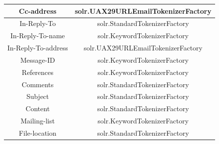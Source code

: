 \documentclass[a4paper,english]{report}
\begin{document}
\begin{center}
\begin{tabular}{||c | c||}
\hline
Cc-address & solr.UAX29URLEmailTokenizerFactory\\

\hline 
In-Reply-To & solr.StandardTokenizerFactory\\

\hline
In-Reply-To-name & solr.KeywordTokenizerFactory\\

\hline
In-Reply-To-address & solr.UAX29URLEmailTokenizerFactory\\

\hline 
Message-ID &  solr.KeywordTokenizerFactory\\

\hline 
 References &  solr.KeywordTokenizerFactory \\

\hline 
Comments &  solr.StandardTokenizerFactory \\

\hline 
Subject &  solr.StandardTokenizerFactory \\

\hline 
Content &  solr.StandardTokenizerFactory \\

\hline 
Mailing-list & solr.KeywordTokenizerFactory \\

\hline
File-location &  solr.StandardTokenizerFactory \\
\hline
\end{tabular}
\end{center}








\printbibliography
\end{document}
